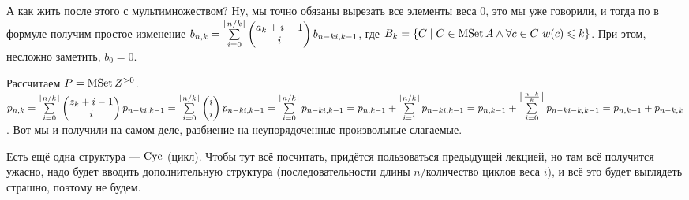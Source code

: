 \documentclass{article}
\begin{document}
\begin{itemize}
\begin{Proof}
        \end{Proof}
        \begin{Comment}
            А как жить после этого с мультимножеством? Ну, мы точно обязаны вырезать все элементы веса 0, это мы уже говорили, и тогда по в формуле получим простое изменение $b_{n,k}=\sum\limits_{i=0}^{\lfloor n/k\rfloor}\left(\begin{matrix}a_k+i-1\\i\end{matrix}\right)b_{n-ki,k-1}$, где $B_k=\{C\mid C\in\operatorname{MSet} A\land\forall c\in C~w(c)\leqslant k\}$. При этом, несложно заметить, $b_0=0$.
        \end{Comment}
        \begin{Example}
            Рассчитаем $P=\operatorname{MSet} Z^{>0}$. $p_{n,k}=\sum\limits_{i=0}^{\lfloor n/k\rfloor}\left(\begin{matrix}z_k+i-1\\i\end{matrix}\right)p_{n-ki,k-1}=\sum\limits_{i=0}^{\lfloor n/k\rfloor}\left(\begin{matrix}i\\i\end{matrix}\right)p_{n-ki,k-1}=\sum\limits_{i=0}^{\lfloor n/k\rfloor}p_{n-ki,k-1}=p_{n,k-1}+\sum\limits_{i=1}^{\lfloor n/k\rfloor}p_{n-ki,k-1}=p_{n,k-1}+\sum\limits_{i=0}^{\left\lfloor\frac{n-k}k\right\rfloor}p_{n-ki-k,k-1}=p_{n,k-1}+p_{n-k,k}$. Вот мы и получили на самом деле, разбиение на неупорядоченные произвольные слагаемые.
        \end{Example}
        \begin{Comment}
            Есть ещё одна структура --- $\operatorname{Cyc}$ (цикл). Чтобы тут всё посчитать, придётся пользоваться предыдущей лекцией, но там всё получится ужасно, надо будет вводить дополнительную структура (последовательности длины $n/\text{количество циклов}$ веса $i$), и всё это будет выглядеть страшно, поэтому не будем.
        \end{Comment}
        \begin{Comment}

\end{Comment}
\end{itemize}
\end{document}
